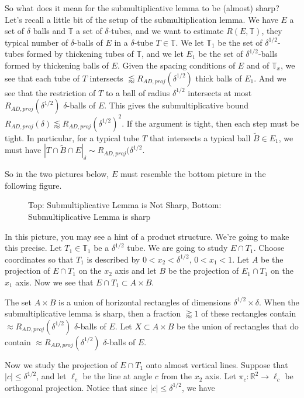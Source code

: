 \documentclass[12pt]{amsart}
\newcommand{\RR}{\mathbb{R}}
\newcommand{\TT}{\mathbb{T}}
\begin{document}
So what does it mean for the submultiplicative lemma to be (almost) sharp?  Let's recall a little bit of the setup of the submultiplication lemma.  We have $E$ a set of $\delta$ balls and $\TT$ a set of $\delta$-tubes, and we want to estimate $R(E, \TT)$,  they typical number of $\delta$-balls of $E$ in a $\delta$-tube $T \in \TT$.   We let $\TT_1$ be the set of $\delta^{1/2}$-tubes formed by thickening tubes of $\TT$,  and we let $E_1$ be the set of $\delta^{1/2}$-balls formed by thickening balls of $E$.   Given the spacing conditions of $E$ and of $\TT_x$,  we see that each tube of $T$ intersects $\lessapprox R_{AD, proj}(\delta^{1/2})$ thick balls of $E_1$.   And we see that the restriction of $T$ to a ball of radius $\delta^{1/2}$ intersects at most $R_{AD, proj}(\delta^{1/2})$ $\delta$-balls of $E$.   This gives the submultiplicative bound $R_{AD, proj}(\delta) \lessapprox R_{AD,proj}(\delta^{1/2})^2$.   If the argument is tight,  then each step must be tight.  In particular,  for a typical tube $T$ that intersects a typical ball $\tilde B \in E_1$,  we must have $|T \cap \tilde B \cap E|_\delta \sim R_{AD, proj}(\delta^{1/2}$.

So in the two pictures below, $E$ must resemble the bottom picture in the following figure.

\begin{figure}
\centering 

\caption{Top: Submultiplicative Lemma is Not Sharp, Bottom: Submultiplicative Lemma is sharp} 
\end{figure}

In this picture,  you may see a hint of a product structure.  We're going to make this precise.   Let $T_1 \in \TT_1$ be a $\delta^{1/2}$ tube.   We are going to study $E \cap T_1$.   Choose coordinates so that $T_1$ is described by $0 < x_2 < \delta^{1/2}$,  $0 < x_1 < 1$.   Let $A$ be the projection of $E \cap T_1$ on the $x_2$ axis and let $B$ be the projection of $E_1 \cap T_1$ on the $x_1$ axis.   Now we see that $E \cap T_1 \subset A \times B$.   

The set $A \times B$ is a union of horizontal rectangles of dimensions $\delta^{1/2} \times \delta$.   When the submultiplicative lemma is sharp,  then a fraction $\gtrapprox 1$ of these rectangles contain $\approx R_{AD, proj}(\delta^{1/2})$ $\delta$-balls of $E$.   Let $X \subset A \times B$ be the union of rectangles that do contain $\approx R_{AD, proj}(\delta^{1/2})$ $\delta$-balls of $E$. 

Now we study the projection of $E \cap T_1$ onto almost vertical lines.  Suppose that $|c| \le \delta^{1/2}$,  and let $\ell_c$ be the line at angle $c$ from the $x_2$ axis.   Let $\pi_c: \RR^2 \rightarrow \ell_c$ be orthogonal projection.   Notice that since $|c| \le \delta^{1/2}$,  we have
\end{document}
